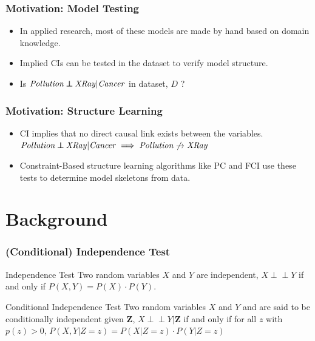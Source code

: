 \documentclass{beamer}
\def\ci{\perp\!\!\!\!\!\perp}
\begin{document}
\begin{frame}
	\frametitle{Motivation: Model Testing}
	\begin{itemize}
		\setlength\itemsep{1em}
		\item In applied research, most of these models are made by hand
			based on domain knowledge.
		\item Implied CIs can be tested in the dataset to verify
			model structure.
		\item Is $ \text{\emph{Pollution}} \ci \text{\emph{XRay}} | \text{\emph{Cancer}} $ in dataset, $ D $ ?
	\end{itemize}

\end{frame}

\begin{frame}
	\frametitle{Motivation: Structure Learning}
	\begin{itemize}
		\setlength\itemsep{1em}
		\item CI implies that no direct causal link exists between the variables. \newline
		\hspace*{20pt} $ \text{\emph{Pollution}} \ci \text{\emph{XRay}} | \text{\emph{Cancer}} \implies \text{\emph{Pollution}} \not \rightarrow  \text{\emph{XRay}} $

		\item Constraint-Based structure learning algorithms like PC
			and FCI use these tests to determine model skeletons
			from data.
	\end{itemize}
\end{frame}

\section{Background}
\begin{frame}
	\frametitle{(Conditional) Independence Test}
	\begin{block}{Independence Test}
		Two random variables $ X $ and $ Y $ are independent,
		$ X \ci Y $ if and only if $ P(X, Y) = P(X) \cdot P(Y) $.
	\end{block}
	\vspace{1em}

	\begin{block}{Conditional Independence Test} Two random variables $ X $
		and $ Y $ and are said to be conditionally independent given $
		\bm{Z} $, $ X \ci Y | \bm{Z} $ if and only if for all $ z $
		with $ p(z) > 0 $, $ P(X, Y | Z=z) = P(X | Z=z) \cdot P(Y |
		Z=z) $
	\end{block}
\end{frame}
\end{document}
